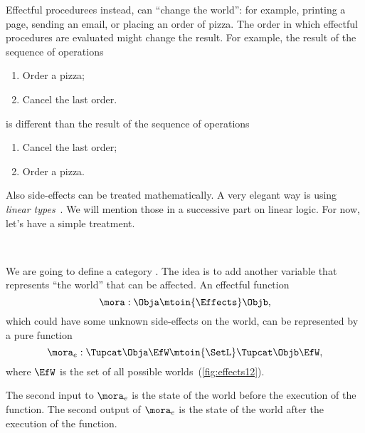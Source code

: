 Effectful procedurees instead, can ``change the world'': for example, printing a page, sending an email, or placing an order of pizza.
The order in which effectful procedures are evaluated might change the result.
For example, the result of the sequence of operations
%
\begin{enumerate}
    \item Order a pizza;
    \item Cancel the last order.
\end{enumerate}
%
is different than the result of the sequence of operations
%
\begin{enumerate}
    \item Cancel the last order;
    \item Order a pizza.
\end{enumerate}

Also side-effects can be treated mathematically.
A very elegant way is using \emph{linear types}~\cite{Wadler90lineartypes}.
We will mention those in a successive part on linear logic.
For now, let's have a simple treatment.

\begin{marginfigure}
    \centering
    \\
    \caption{}
    \label{fig:effects12}
\end{marginfigure}

We are going to define a category \Effects.
The idea is to add another variable that represents ``the world'' that can be affected.
An effectful function
%
\begin{equation}
    \mora: \Obja \mtoin{\Effects} \Objb,
\end{equation}
%
which could have some unknown side-effects on the world, can be represented by a pure function
%
\begin{equation}
    \mora_e:  \Tupcat \Obja   \EfW \mtoin{\SetL}   \Tupcat  \Objb \EfW,
\end{equation}
%
where $\EfW$ is the set of all possible worlds~(\cref{fig:effects12}).

The second input to $\mora_e$ is the state of the world before the execution of the function.
The second output of $\mora_e$ is the state of the world after the execution of the function.

